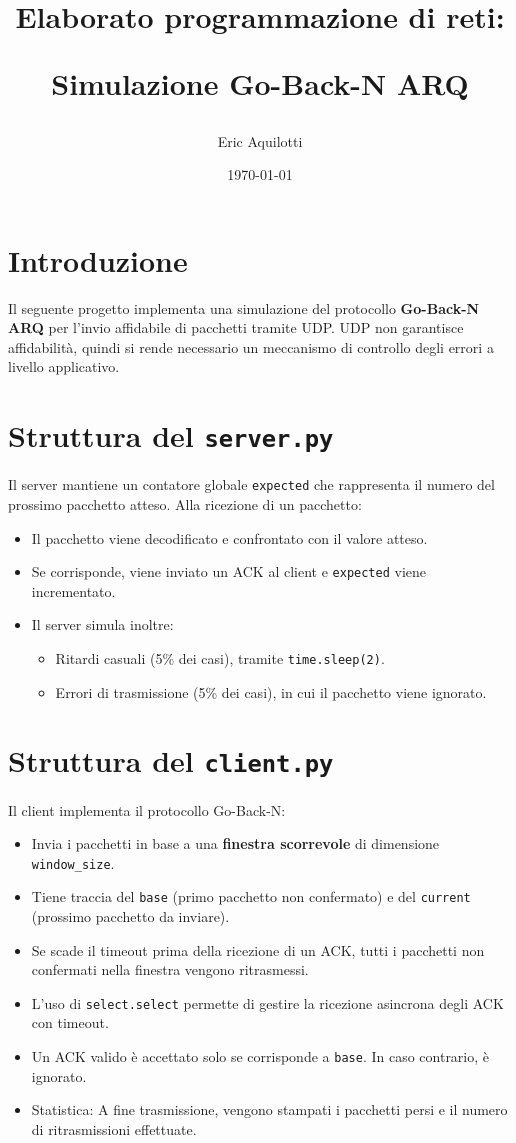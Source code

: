 \documentclass{article}
\title{
    Elaborato programmazione di reti:
    
    Simulazione Go-Back-N ARQ
}
\author{Eric Aquilotti}
\date{\today}
\begin{document}
\maketitle

\section{Introduzione}
Il seguente progetto implementa una simulazione del protocollo
\textbf{Go-Back-N ARQ} per l'invio affidabile di pacchetti tramite UDP. UDP non
garantisce affidabilità, quindi si rende necessario un meccanismo di controllo
degli errori a livello applicativo.

\section{Struttura del \texttt{server.py}}

Il server mantiene un contatore globale \texttt{expected} che rappresenta il
numero del prossimo pacchetto atteso. Alla ricezione di un pacchetto:
\begin{itemize}
    \item Il pacchetto viene decodificato e confrontato con il valore atteso.
    \item Se corrisponde, viene inviato un ACK al client e \texttt{expected}
        viene incrementato.
    \item Il server simula inoltre:
    \begin{itemize}
        \item Ritardi casuali (5\% dei casi), tramite \texttt{time.sleep(2)}.
        \item Errori di trasmissione (5\% dei casi), in cui il pacchetto viene
            ignorato.
    \end{itemize}
\end{itemize}

\section{Struttura del \texttt{client.py}}

Il client implementa il protocollo Go-Back-N:
\begin{itemize}
    \item Invia i pacchetti in base a una \textbf{finestra scorrevole} di
        dimensione \texttt{window\_size}.
    \item Tiene traccia del \texttt{base} (primo pacchetto non confermato) e del
        \texttt{current} (prossimo pacchetto da inviare).
    \item Se scade il timeout prima della ricezione di un ACK, tutti i pacchetti
        non confermati nella finestra vengono ritrasmessi.
    \item L'uso di \texttt{select.select} permette di gestire la ricezione
        asincrona degli ACK con timeout.
    \item Un ACK valido è accettato solo se corrisponde a \texttt{base}. In caso
        contrario, è ignorato.
    \item Statistica: A fine trasmissione, vengono stampati i pacchetti
        persi e il numero di ritrasmissioni effettuate.
\end{itemize}
\end{document}
